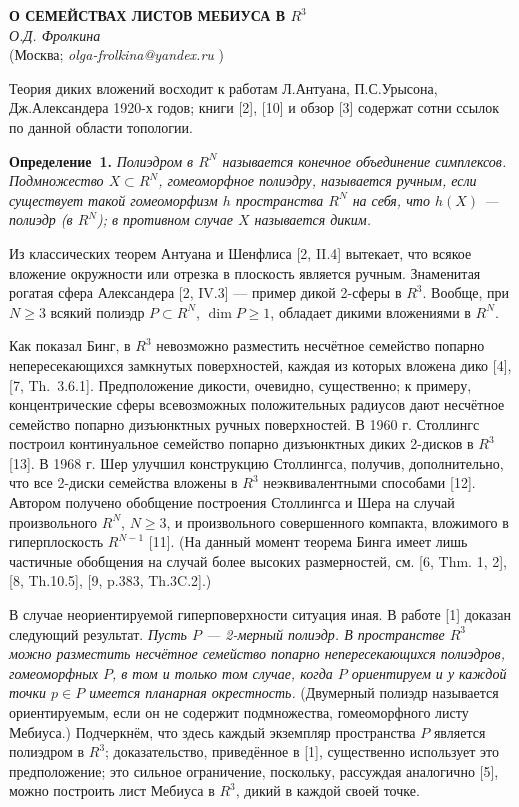 \begin{center}{ \bf  О СЕМЕЙСТВАХ ЛИСТОВ МЕБИУСА В $R^3$}\\
{\it О.Д. Фролкина } \\
(Москва; {\it olga-frolkina@yandex.ru} )
\end{center}


Теория диких вложений
восходит к работам Л.Антуана, П.С.Урысона,
Дж.Александера 1920-х годов;
книги [2], [10] и обзор [3]
содержат сотни ссылок по данной области
топологии.

\textbf{Определение~1.} {\it
Полиэдром в $R^N$ называется
конечное объединение симплексов.
Подмножество $X\subset R^N$, гомеоморфное полиэдру,
называется ручным, если существует такой гомеоморфизм
$h$ пространства $R^N$ на себя, что
$h(X)$  --- полиэдр (в $R^N$);
в противном случае $X$ называется диким.
}

Из классических теорем Антуана и
Шенфлиса [2, II.4] вытекает, что
всякое вложение
окружности или отрезка в плоскость является
ручным.
Знаменитая рогатая сфера Александера [2, IV.3] --- пример
дикой 2-сферы в $R^3$.
Вообще, при $N\geqslant 3$
всякий полиэдр $P\subset R^N$, $\dim P\geqslant 1$,
обладает дикими вложениями в $R^N$.

Как показал Бинг,
в $R^3$ невозможно разместить
несчётное семейство попарно непересекающихся
замкнутых поверхностей,
каждая из которых вложена дико [4], [7, Th.~3.6.1].
Предположение дикости, очевидно, существенно;
к примеру, концентрические сферы всевозможных
положительных радиусов дают несчётное семейство попарно дизъюнктных ручных поверхностей.
В 1960 г. Столлингс построил континуальное
семейство попарно дизъюнктных диких 2-дисков
в $R^3$ [13].
В 1968 г. Шер улучшил конструкцию Столлингса,
получив, дополнительно, что все 2-диски
семейства вложены в $R^3$ неэквивалентными способами [12].
Автором получено обобщение построения Столлингса и Шера на случай
произвольного $R^N$, $N\geqslant 3$,
и произвольного совершенного компакта,
вложимого в гиперплоскость $R^{N-1}$ [11].
(На данный момент теорема Бинга
имеет лишь частичные обобщения на случай более высоких размерностей,
см. [6, Thm. 1, 2],
[8, Th.10.5],
[9, p.383, Th.3C.2].)

В случае неориентируемой гиперповерхности ситуация иная.
В работе [1]
доказан следующий результат.
{\it Пусть $P$ --- 2-мерный полиэдр.
В пространстве $R^3$ можно разместить несчётное
семейство попарно непересекающихся
полиэдров, гомеоморфных $P$,
в том и только том случае, когда
$P$ ориентируем и у каждой точки
$p\in P$
имеется планарная окрестность.}
(Двумерный полиэдр называется
ориентируемым, если он не содержит подмножества,
гомеоморфного листу Мебиуса.)
Подчеркнём, что
здесь каждый экземпляр пространства $P$
является полиэдром в $R^3$;
доказательство,
приведённое в [1],
существенно использует это предположение;
это сильное ограничение, поскольку,
рассуждая аналогично [5], можно построить лист Мебиуса в
$R^3$, дикий в каждой своей точке.

